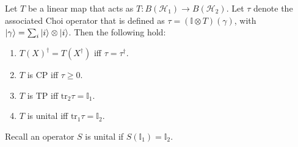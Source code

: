 \documentclass[../../note.tex]{subfiles}
\begin{document}
\begin{proposition}
Let $T$ be a linear map that acts as $T: B(\mathcal{H}_1)\rightarrow B(\mathcal{H}_2)$. Let $\tau$ denote the associated Choi operator that is defined as $\tau =(\mathbb{I} \otimes T)(\gamma)$, with $\ket{\gamma} = \sum_i \ket{i}\otimes \ket{i}$. Then the following hold:
\begin{enumerate}
    \item $T(X)^{\dagger}=T(X^{\dagger})$ iff $\tau=\tau^{\dagger}$.
    \item $T$ is CP iff $\tau \geq 0$.
    \item $T$ is TP iff $\text{tr}_2 \tau=\mathbb{I}_1$.
    \item $T$ is unital iff $\text{tr}_1 \tau = \mathbb{I}_2$.
\end{enumerate}
Recall an operator $S$ is unital if $S(\mathbb{I}_1)=\mathbb{I}_2$.
\end{proposition}
\end{document}

